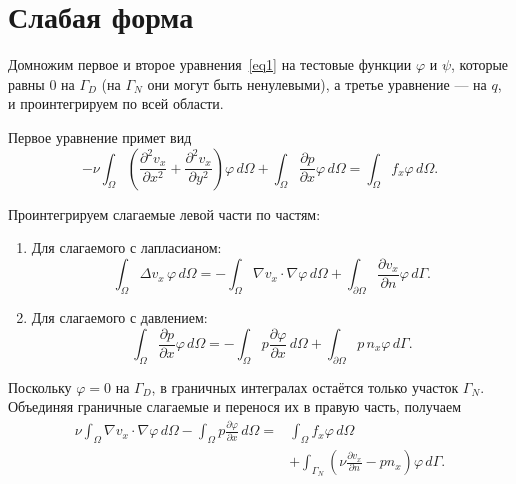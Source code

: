 \documentclass[a4paper,14pt]{extarticle}
\begin{document}
	
	\section{Слабая форма}
	
	Домножим первое и второе уравнения~\eqref{eq1}
	на тестовые функции $\varphi$ и $\psi$, которые равны 0 на
	$\Gamma_D$ (на $\Gamma_N$ они могут быть ненулевыми), а третье уравнение --- на $q$, и проинтегрируем по всей области.

	
	Первое уравнение примет  вид
	\begin{equation}
		-\nu \int_{\Omega}
		\left(
		\frac{\partial^2 v_x}{\partial x^2}
		+
		\frac{\partial^2 v_x}{\partial y^2}
		\right)
		\varphi \, d\Omega
		+
		\int_{\Omega}
		\frac{\partial p}{\partial x}
		\varphi \, d\Omega
		=
		\int_{\Omega} f_x\varphi \, d\Omega.
	\end{equation}
	
	Проинтегрируем слагаемые левой части по частям:
	\begin{enumerate}
		\item Для слагаемого с лапласианом:
		\begin{equation*}
			\int_{\Omega}
			\Delta v_x\,\varphi \, d\Omega
			=
			-\int_{\Omega}
			\nabla v_x\cdot\nabla\varphi \, d\Omega
			+
			\int_{\partial\Omega}
			\frac{\partial v_x}{\partial n}
			\varphi \, d\Gamma.
		\end{equation*}
		
		\item Для слагаемого с давлением:
		\begin{equation*}
			\int_{\Omega}
			\frac{\partial p}{\partial x}
			\varphi \, d\Omega
			=
			-\int_{\Omega}
			p\frac{\partial\varphi}{\partial x} \, d\Omega
			+
			\int_{\partial\Omega}
			p\,n_x\varphi \, d\Gamma.
		\end{equation*}
	\end{enumerate}
	
	Поскольку $\varphi=0$ на $\Gamma_D$, в граничных интегралах
	остаётся только участок $\Gamma_N$. Объединяя граничные
	слагаемые и перенося их в правую часть, получаем
	\begin{equation*}
		\begin{aligned}
			\nu\int_{\Omega}
			\nabla v_x\cdot\nabla\varphi \, d\Omega
			-
			\int_{\Omega}
			p\frac{\partial\varphi}{\partial x} \, d\Omega
			={}&
			\int_{\Omega} f_x\varphi \, d\Omega
			\\
			&+
			\int_{\Gamma_N}
			\left(
			\nu\frac{\partial v_x}{\partial n}
			-p n_x
			\right)
			\varphi \, d\Gamma.
		\end{aligned}
	\end{equation*}
	
\end{document}
